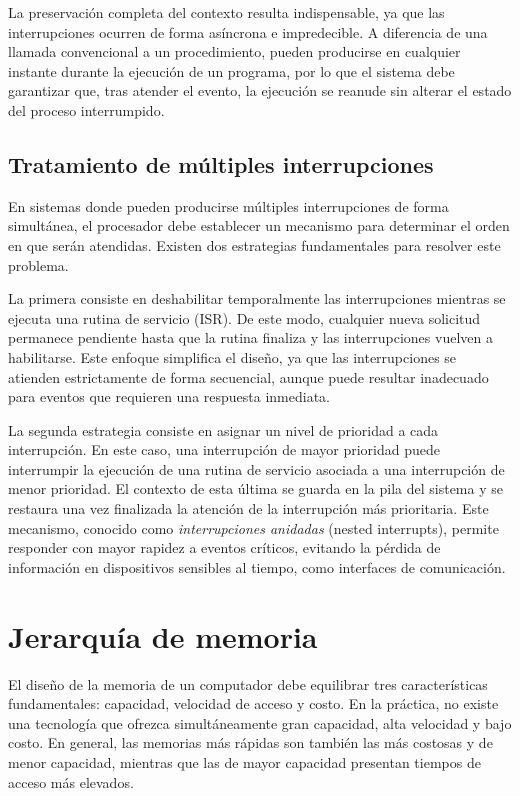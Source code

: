 La preservación completa del contexto resulta indispensable, ya que las interrupciones ocurren de forma asíncrona e impredecible. A diferencia de una llamada convencional a un procedimiento, pueden producirse en cualquier instante durante la ejecución de un programa, por lo que el sistema debe garantizar que, tras atender el evento, la ejecución se reanude sin alterar el estado del proceso interrumpido.

\subsection{Tratamiento de múltiples interrupciones}

En sistemas donde pueden producirse múltiples interrupciones de forma simultánea, el procesador debe establecer un mecanismo para determinar el orden en que serán atendidas. Existen dos estrategias fundamentales para resolver este problema.

La primera consiste en deshabilitar temporalmente las interrupciones mientras se ejecuta una rutina de servicio (ISR). De este modo, cualquier nueva solicitud permanece pendiente hasta que la rutina finaliza y las interrupciones vuelven a habilitarse. Este enfoque simplifica el diseño, ya que las interrupciones se atienden estrictamente de forma secuencial, aunque puede resultar inadecuado para eventos que requieren una respuesta inmediata.

La segunda estrategia consiste en asignar un nivel de prioridad a cada interrupción. En este caso, una interrupción de mayor prioridad puede interrumpir la ejecución de una rutina de servicio asociada a una interrupción de menor prioridad. El contexto de esta última se guarda en la pila del sistema y se restaura una vez finalizada la atención de la interrupción más prioritaria. Este mecanismo, conocido como \emph{interrupciones anidadas} (nested interrupts), permite responder con mayor rapidez a eventos críticos, evitando la pérdida de información en dispositivos sensibles al tiempo, como interfaces de comunicación.

\section{Jerarquía de memoria}

El diseño de la memoria de un computador debe equilibrar tres características fundamentales: capacidad, velocidad de acceso y costo. En la práctica, no existe una tecnología que ofrezca simultáneamente gran capacidad, alta velocidad y bajo costo. En general, las memorias más rápidas son también las más costosas y de menor capacidad, mientras que las de mayor capacidad presentan tiempos de acceso más elevados.

